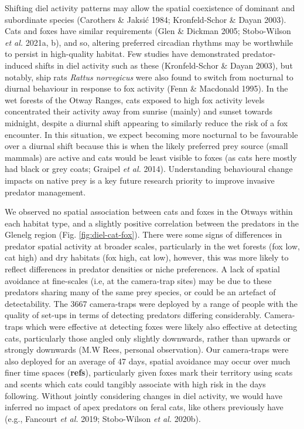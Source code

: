 \documentclass[11pt,a4paper,titlepage,twoside,openright]{style/unimelbthesis}
\begin{document}
\begin{mainmatter}
Shifting diel activity patterns may allow the spatial coexistence of dominant and subordinate species (Carothers \& Jaksić 1984; Kronfeld-Schor \& Dayan 2003). Cats and foxes have similar requirements (Glen \& Dickman 2005; Stobo-Wilson \emph{et al.} 2021a, b), and so, altering preferred circadian rhythms may be worthwhile to persist in high-quality habitat. Few studies have demonstrated predator-induced shifts in diel activity such as these (Kronfeld-Schor \& Dayan 2003), but notably, ship rats \emph{Rattus norvegicus} were also found to switch from nocturnal to diurnal behaviour in response to fox activity (Fenn \& Macdonald 1995). In the wet forests of the Otway Ranges, cats exposed to high fox activity levels concentrated their activity away from sunrise (mainly) and sunset towards midnight, despite a diurnal shift appearing to similarly reduce the risk of a fox encounter. In this situation, we expect becoming more nocturnal to be favourable over a diurnal shift because this is when the likely preferred prey source (small mammals) are active and cats would be least visible to foxes (as cats here mostly had black or grey coats; Graipel \emph{et al.} 2014). Understanding behavioural change impacts on native prey is a key future research priority to improve invasive predator management.

We observed no spatial association between cats and foxes in the Otways within each habitat type, and a slightly positive correlation between the predators in the Glenelg region (Fig. \ref{fig:diel-cat-fox}). There were some signs of differences in predator spatial activity at broader scales, particularly in the wet forests (fox low, cat high) and dry habitats (fox high, cat low), however, this was more likely to reflect differences in predator densities or niche preferences. A lack of spatial avoidance at fine-scales (i.e, at the camera-trap sites) may be due to these predators sharing many of the same prey species, or could be an artefact of detectability. The 3667 camera-traps were deployed by a range of people with the quality of set-ups in terms of detecting predators differing considerably. Camera-traps which were effective at detecting foxes were likely also effective at detecting cats, particularly those angled only slightly downwards, rather than upwards or strongly downwards (M.W Rees, personal observation). Our camera-traps were also deployed for an average of 47 days, spatial avoidance may occur over much finer time spaces (\textbf{refs}), particularly given foxes mark their territory using scats and scents which cats could tangibly associate with high risk in the days following. Without jointly considering changes in diel activity, we would have inferred no impact of apex predators on feral cats, like others previously have (e.g., Fancourt \emph{et al.} 2019; Stobo-Wilson \emph{et al.} 2020b).


\end{mainmatter}
\end{document}
